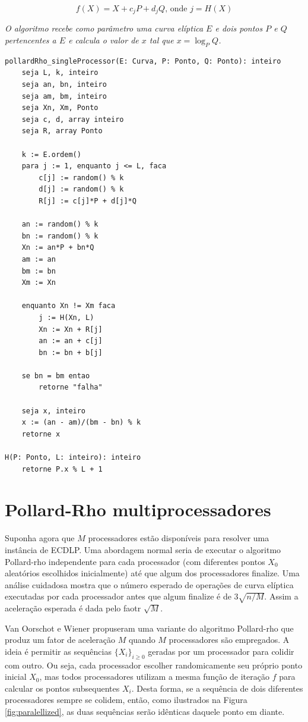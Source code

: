 \begin{equation*}
f(X) = X + c_jP + d_jQ \textrm{, onde } j = H(X)
\end{equation*}

\textit{O algoritmo recebe como parâmetro uma curva elíptica \(E\) e dois pontos \(P\) e \(Q\) pertencentes a \(E\) e calcula o valor de \(x\) tal que $x = \log_P Q$.}

% 
%
\begin{lstlisting}[caption={Algoritmo Pollard-Rho com único processador.},label=single_processor]
pollardRho_singleProcessor(E: Curva, P: Ponto, Q: Ponto): inteiro
	seja L, k, inteiro
	seja an, bn, inteiro
	seja am, bm, inteiro
	seja Xn, Xm, Ponto
	seja c, d, array inteiro
	seja R, array Ponto

	k := E.ordem()
	para j := 1, enquanto j <= L, faca
		c[j] := random() % k
		d[j] := random() % k
		R[j] := c[j]*P + d[j]*Q

	an := random() % k
	bn := random() % k
	Xn := an*P + bn*Q
	am := an
	bm := bn
	Xm := Xn

	enquanto Xn != Xm faca
		j := H(Xn, L)
		Xn := Xn + R[j]
		an := an + c[j]
		bn := bn + b[j]

	se bn = bm entao
		retorne "falha"

	seja x, inteiro
	x := (an - am)/(bm - bn) % k
	retorne x

H(P: Ponto, L: inteiro): inteiro
	retorne P.x % L + 1

\end{lstlisting}

%
%
\section{Pollard-Rho multiprocessadores}
Suponha agora que \(M\) processadores estão disponíveis para resolver uma instância de ECDLP. Uma abordagem normal seria de executar o algoritmo Pollard-rho independente para cada processador (com diferentes pontos \(X_0\) aleatórios escolhidos inicialmente) até que algum dos processadores finalize. Uma análise cuidadosa mostra que o número esperado de operações de curva elíptica executadas por cada processador antes que algum finalize é de $3\sqrt{n/M}$. Assim a aceleração esperada é dada pelo faotr $\sqrt{M}$.

Van Oorschot e Wiener propuseram uma variante do algoritmo Pollard-rho que produz um fator de aceleração \(M\) quando \(M\) processadores são empregados. A ideia é permitir as sequências $\{X_i\}_{i \geq 0}$ geradas por um processador para colidir com outro. Ou seja, cada processador escolher randomicamente seu próprio ponto inicial \(X_0\), mas todos processadores utilizam a mesma função de iteração \(f\) para calcular os pontos subsequentes \(X_i\). Desta forma, se a sequência de dois diferentes processadores sempre se colidem, então, como ilustrados na Figura \ref{fig:paralellized}, as duas sequências serão idênticas daquele ponto em diante.

